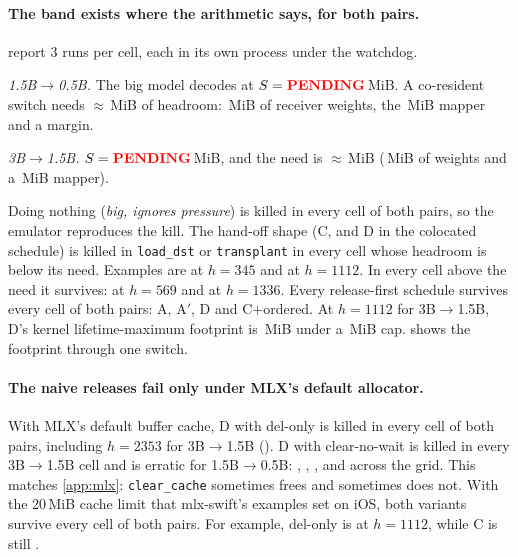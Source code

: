 \paragraph{The band exists where the arithmetic says, for both pairs.}
 report 3 runs per cell, each in its own process under the watchdog.

\emph{1.5B$\to$0.5B.} The big model decodes at $S=\res{m.15b-05b.S}$\,MiB.
A co-resident switch needs $\approx$\,MiB of headroom: \,MiB of receiver weights, the \,MiB mapper and a margin.

\emph{3B$\to$1.5B.} $S=\res{m.3b-15b.S}$\,MiB, and the need is $\approx$\,MiB (\,MiB of weights and a \,MiB mapper).

Doing nothing (\emph{big, ignores pressure}) is killed in every cell of both pairs, so the emulator reproduces the kill.
The hand-off shape (C, and D in the colocated schedule) is killed in \texttt{load\_dst} or \texttt{transplant} in every cell whose headroom is below its need.
Examples are  at $h=345$ and  at $h=1112$.
In every cell above the need it survives:  at $h=569$ and  at $h=1336$.
Every release-first schedule survives every cell of both pairs: A, A$'$, D and C$+$ordered.
At $h=1112$ for 3B$\to$1.5B, D's kernel lifetime-maximum footprint is \,MiB under a \,MiB cap.
 shows the footprint through one switch.

\paragraph{The naive releases fail only under MLX's default allocator.}
With MLX's default buffer cache, D with del-only is killed in every cell of both pairs, including $h=2353$ for 3B$\to$1.5B ().
D with clear-no-wait is killed in every 3B$\to$1.5B cell and is erratic for 1.5B$\to$0.5B: , , ,  and  across the grid.
This matches \cref{app:mlx}: \texttt{clear\_cache} sometimes frees and sometimes does not.
With the 20\,MiB cache limit that mlx-swift's examples set on iOS, both variants survive every cell of both pairs.
For example, del-only is  at $h=1112$, while C is still .

